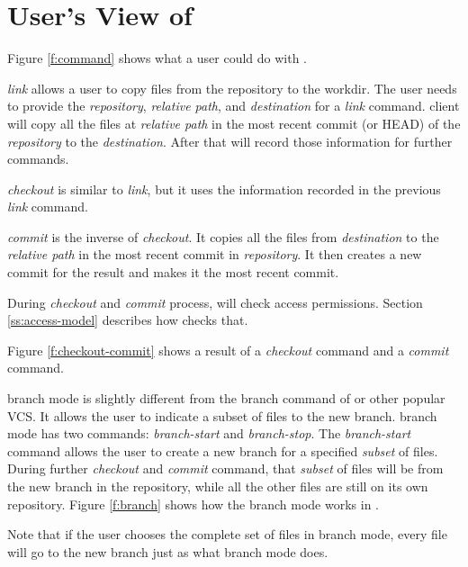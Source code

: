 \section{User's View of \Sys}
\label{userview}

\iffalse
    * Describe what action a user could make. Write a table for all the actions.
    * Describe the functionality for each important action which can not be
      described completely in the table.
    * Mention how each action is related to the FVM Daemon, if needed. (probably
      not needed)
\fi







Figure \ref{f:command} shows what a user could do with \sys.


\emph{link} allows a user to copy files from the repository to the workdir.
The user needs to provide the \emph{repository}, \emph{relative path}, and
\emph{destination} for a \emph{link} command. \Sys client will copy all the files
at \emph{relative path} in the most recent commit (or HEAD) of the
\emph{repository} to the \emph{destination}. After that \sys will record those
information for further commands.

\emph{checkout} is similar to \emph{link}, but it uses the information recorded
in the previous \emph{link} command.

\emph{commit} is the inverse
of \emph{checkout}. It
copies all the files from \emph{destination} to the \emph{relative path} in the
most recent commit in \emph{repository}. It then creates a new commit for the
result and makes it the most recent commit.

During \emph{checkout} and \emph{commit} process, \sys will check access
permissions. Section \ref{ss:access-model} describes how \sys checks that.

Figure \ref{f:checkout-commit} shows a result of a \emph{checkout} command and
a \emph{commit} command.


\Sys branch mode is slightly different from the branch command of \git or other
popular VCS. It allows the user to indicate a subset of files to the new branch.
\Sys branch mode has two commands: \emph{branch-start} and \emph{branch-stop}.
The \emph{branch-start} command allows the user to create a new branch for a
specified \emph{subset} of files. During further \emph{checkout} and \emph{commit}
command, that \emph{subset} of files will be from the new branch in the
repository, while all the other files are still on its own repository. Figure
\ref{f:branch} shows how the branch mode works in \sys.

Note that if the user chooses the complete set of files in branch mode, every
file will go to the new branch just as what \git branch mode does.


